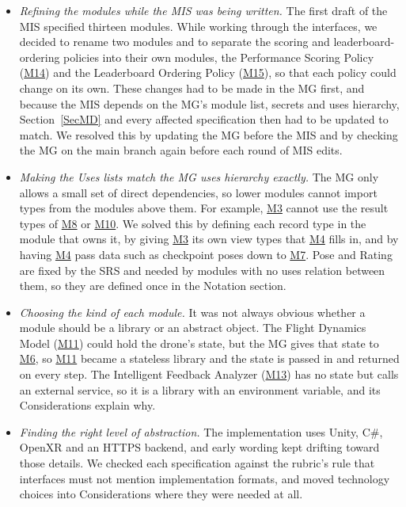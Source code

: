 \documentclass[12pt, titlepage]{article}
\newcommand{\Mref}[1]{\hyperref[sec:M#1]{M#1}}
\begin{document}
\begin{enumerate}
  \begin{itemize}
  \item \emph{Refining the modules while the MIS was being written.} The first
    draft of the MIS specified thirteen modules. While working through the
    interfaces, we decided to rename two modules and to separate the scoring
    and leaderboard-ordering policies into their own modules, the Performance
    Scoring Policy (\Mref{14}) and the Leaderboard Ordering Policy
    (\Mref{15}), so that each policy could change on its own. These changes
    had to be made in the MG first, and because the MIS depends on the MG's
    module list, secrets and uses hierarchy, Section~\ref{SecMD} and every
    affected
    specification then had to be updated to match. We resolved this by
    updating the MG before the MIS and by checking the MG on the main branch
    again before each round of MIS edits.
  \item \emph{Making the Uses lists match the MG uses hierarchy exactly.} The
    MG only allows a small set of direct dependencies, so lower modules cannot
    import types from the modules above them. For example, \Mref{3} cannot use
    the result types of \Mref{8} or \Mref{10}. We solved this by defining
    each record type in the module that owns it, by giving \Mref{3} its own
    view types that \Mref{4} fills in, and by having \Mref{4} pass data such as
    checkpoint poses down to \Mref{7}. Pose and Rating are fixed by the SRS and
    needed by modules with no uses relation between them, so they are defined
    once in the Notation section.
  \item \emph{Choosing the kind of each module.} It was not always obvious
    whether a module should be a library or an abstract object. The Flight
    Dynamics Model (\Mref{11}) could hold the drone's state, but the MG gives
    that state to \Mref{6}, so \Mref{11} became a stateless library and the
    state is passed in and returned on every step. The Intelligent Feedback
    Analyzer (\Mref{13}) has no state but calls an external service, so it is a
    library with an environment variable, and its Considerations explain why.
  \item \emph{Finding the right level of abstraction.} The implementation uses
    Unity, C\#, OpenXR and an HTTPS backend, and early wording kept drifting
    toward those details. We checked each specification against the rubric's
    rule that interfaces must not mention implementation formats, and moved
    technology choices into Considerations where they were needed at all.
  \end{itemize}


\end{enumerate}
\end{document}
